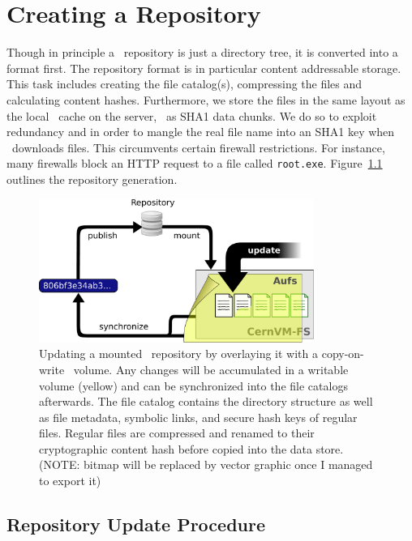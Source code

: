 \chapter{Creating a Repository}
\label{sct:createrepo}

Though in principle a \cvmfs\ repository is just a directory tree, it is converted into a  format first.
The repository format is in particular content addressable storage.
This task includes creating the file catalog(s), compressing the files and calculating content hashes.
Furthermore, we store the files in the same layout as the local \cvmfs\ cache on the server, \ie\ as SHA1 data chunks.
We do so to exploit redundancy and in order to mangle the real file name into an SHA1 key when \cvmfs\ downloads files.
This circumvents certain firewall restrictions.
For instance, many firewalls block an HTTP request to a file called \texttt{root.exe}.
Figure~\ref{fig:installwebserver} outlines the repository generation.

\begin{figure}[h]
	\begin{center}
		\includegraphics[width=0.8\textwidth]{figures/update_process}
	\end{center}
	\caption{Updating a mounted \cvmfs\ repository by overlaying it with a copy-on-write \aufs\ volume. Any changes will be accumulated in a writable volume (yellow) and can be synchronized into the file catalogs afterwards. The file catalog contains the directory structure as well as file metadata, symbolic links, and secure hash keys of regular files. Regular files are compressed and renamed to their cryptographic content hash before copied into the data store. (NOTE: bitmap will be replaced by vector graphic once I managed to export it)}
	\label{fig:installwebserver}
\end{figure}

\section{Repository Update Procedure}
\label{sct:repoupdate}

